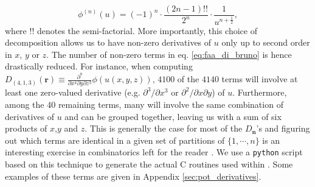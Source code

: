 \begin{equation}
\phi^{(n)}(u) = (-1)^n\cdot\frac{(2n-1)!!}{2^n}\cdot\frac{1}{u^{n+\frac{1}{2}}},
\end{equation}
where $!!$ denotes the semi-factorial. More importantly, this
choice of decomposition allows us to have non-zero derivatives of $u$
only up to second order in $x$, $y$ or $z$. The number of non-zero
terms in eq. \ref{eq:faa_di_bruno} is hence drastically reduced. For
instance, when computing $D_{(4,1,3)}(\mathbf{r}) \equiv
\frac{\partial^8}{\partial x^4 \partial y \partial z^3}
\phi(u(x,y,z))$, $4100$ of the $4140$ terms will involve at least one
zero-valued derivative (e.g. $\partial^3/\partial x^3$ or
$\partial^2/\partial x\partial y$) of $u$. Furthermore, among the 40
remaining terms, many will involve the same combination of derivatives
of $u$ and can be grouped together, leaving us with a sum of six
products of $x$,$y$ and $z$. This is generally the case for most of
the $D_\mathbf{n}$'s and figuring out which terms are identical in a
given set of partitions of $\lbrace1,\cdots, n\rbrace$ is an
interesting exercise in combinatorics left for the reader \citep[see
  also][]{Hardy2006}. We use a \texttt{python} script based on this
technique to generate the actual C routines used within \swift. Some
examples of these terms are given in Appendix
\ref{sec:pot_derivatives}.

